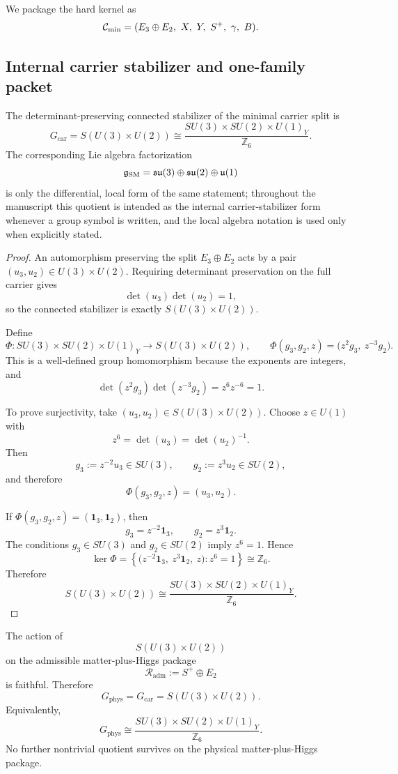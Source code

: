 We package the hard kernel as
\[
\Cmin=(E_3\oplus E_2,\ X,\ Y,\ S^+,\ \gamma,\ B).
\]

\subsection{Internal carrier stabilizer and one-family packet}

\begin{theorem}
\label{thm:global-sm-theorem}
The determinant-preserving connected stabilizer of the minimal carrier split is
\[
G_{\mathrm{car}}
=
S(U(3)\times U(2))
\cong
\frac{SU(3)\times SU(2)\times U(1)_Y}{\mathbb Z_6}.
\]
The corresponding Lie algebra factorization
\[
\mathfrak g_{\mathrm{SM}}=\mathfrak{su}(3)\oplus\mathfrak{su}(2)\oplus\mathfrak u(1)
\]
is only the differential, local form of the same statement; throughout the manuscript this quotient
is intended as the internal carrier-stabilizer form whenever a group symbol is written, and the
local algebra notation is used only when explicitly stated.
\end{theorem}

\begin{proof}
An automorphism preserving the split $E_3\oplus E_2$ acts by a pair
$(u_3,u_2)\in U(3)\times U(2)$. Requiring determinant preservation on the full
carrier gives
\[
\det(u_3)\det(u_2)=1,
\]
so the connected stabilizer is exactly $S(U(3)\times U(2))$.

Define
\[
\Phi:SU(3)\times SU(2)\times U(1)_Y \longrightarrow S(U(3)\times U(2)),
\qquad
\Phi(g_3,g_2,z)=\bigl(z^2 g_3,\ z^{-3} g_2\bigr).
\]
This is a well-defined group homomorphism because the exponents are integers, and
\[
\det(z^2 g_3)\det(z^{-3} g_2)=z^6 z^{-6}=1.
\]

To prove surjectivity, take $(u_3,u_2)\in S(U(3)\times U(2))$. Choose
$z\in U(1)$ with
\[
z^6=\det(u_3)=\det(u_2)^{-1}.
\]
Then
\[
g_3:=z^{-2}u_3\in SU(3),
\qquad
g_2:=z^{3}u_2\in SU(2),
\]
and therefore
\[
\Phi(g_3,g_2,z)=(u_3,u_2).
\]

If $\Phi(g_3,g_2,z)=(\mathbf 1_3,\mathbf 1_2)$, then
\[
g_3=z^{-2}\mathbf 1_3,
\qquad
g_2=z^{3}\mathbf 1_2.
\]
The conditions $g_3\in SU(3)$ and $g_2\in SU(2)$ imply $z^6=1$. Hence
\[
\ker\Phi
=
\left\{
\bigl(z^{-2}\mathbf 1_3,\ z^{3}\mathbf 1_2,\ z\bigr): z^6=1
\right\}
\cong \mathbb Z_6.
\]
Therefore
\[
S(U(3)\times U(2))
\cong
\frac{SU(3)\times SU(2)\times U(1)_Y}{\mathbb Z_6}.
\]
\end{proof}

\begin{theorem}
\label{thm:physical-gauge-group}
\label{thm:physical-gauge-group-faithful}
The action of
\[
S(U(3)\times U(2))
\]
on the admissible matter-plus-Higgs package
\[
\mathcal R_{\mathrm{adm}}:=S^+\oplus E_2
\]
is faithful. Therefore
\[
G_{\mathrm{phys}}=G_{\mathrm{car}}=S(U(3)\times U(2)).
\]
Equivalently,
\[
G_{\mathrm{phys}}
\cong
\frac{SU(3)\times SU(2)\times U(1)_Y}{\mathbb Z_6}.
\]
No further nontrivial quotient survives on the physical matter-plus-Higgs package.
\end{theorem}

